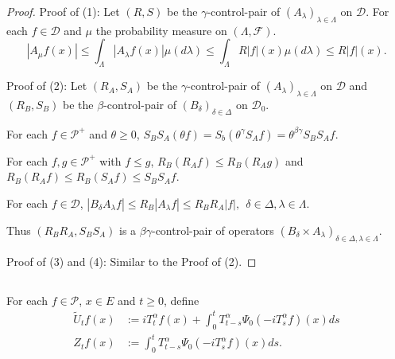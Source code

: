 \documentclass[12pt,oneside,english]{amsart}
\theoremstyle{plain}
\theoremstyle{definition}
\numberwithin{equation}{section}
\newcommand{\added}[1]{{\color{blue}#1}}\newcommand{\deleted}[1]{{\color{red}#1}}
\begin{document}
\added{
\begin{proof}
    Proof of (1): Let $(R,S)$ be the $\gamma$-control-pair of $(A_\lambda)_{\lambda\in\Lambda}$ on $\mathcal{D}$. For each $f \in \mathcal{D}$ and $\mu$ the probability measure on $(\Lambda, \mathscr F)$.
\[
   |A_{\mu}f(x)|\leq \int_{\Lambda}|A_{\lambda}f(x)|\mu(d\lambda) \leq \int_{\Lambda}R|f|(x)\mu(d\lambda) \leq R|f|(x).
\]

   Proof of (2): Let $(R_A, S_A)$ be the $\gamma$-control-pair of $(A_\lambda)_{\lambda\in\Lambda}$ on $\mathcal{D}$ and $(R_B, S_B)$ be the $\beta$-control-pair of $(B_{\delta})_{\delta\in\Delta}$ on $\mathcal{D}_0$.
   
   For each $f\in \mathcal{P}^+$ and $\theta \geq 0$, $S_BS_A(\theta f)=S_b(\theta^{\gamma}S_Af)=\theta^{\beta\gamma}S_BS_Af$.
   
   For each $f,g \in \mathcal P^+$ with $f\leq g$, $R_B(R_A f)\leq R_B(R_A g)$ and $R_B (R_A f)\leq R_B(S_A f)\leq S_BS_A f$. 
   
   For each $f\in \mathcal D$, $|B_{\delta}A_{\lambda}f|\leq R_B|A_{\lambda}f|\leq R_BR_A|f|,~~\delta\in \Delta, \lambda\in\Lambda$. 
   
   Thus $(R_BR_A,S_BS_A)$ is a $\beta\gamma$-control-pair of operators $(B_\delta\times A_\lambda)_{\delta \in \Delta, \lambda \in \Lambda}$.
   
   Proof of (3) and (4): Similar to the Proof of (2).
\end{proof}
}
\subsection{}
    For each $f \in \mathcal{P}$, $x\in E$ and $t\geq 0$, define
\begin{align}
\label{eq: def of Zf}
    \tilde U_t f(x)
    &:= i T^\alpha_t f(x) + \int_0^t T^\alpha_{t-s} \Psi_0(-i T_s^{\alpha}f)(x)ds
    \\Z_t f (x)
    &:= \int_0^t T^\alpha_{t-s} \Psi_0(-i T_s^{\alpha}f)(x)ds.
\end{align}
\end{document}

